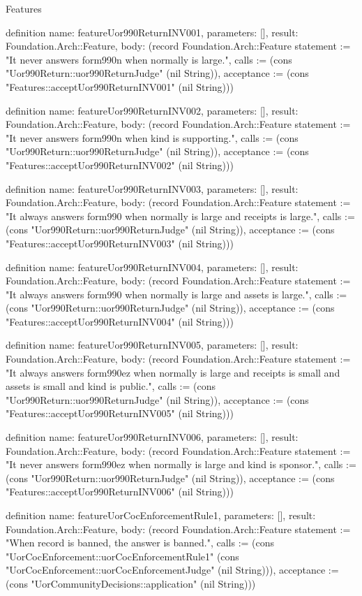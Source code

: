 \begin{lexlean}{Features}
\begin{semanticmodule}
definition{
  name: featureUor990ReturnINV001,
  parameters: [],
  result: Foundation.Arch::Feature,
  body: (record Foundation.Arch::Feature {statement := "It never answers form990n when normally is large.", calls := (cons "Uor990Return::uor990ReturnJudge" (nil String)), acceptance := (cons "Features::acceptUor990ReturnINV001" (nil String))})
}

definition{
  name: featureUor990ReturnINV002,
  parameters: [],
  result: Foundation.Arch::Feature,
  body: (record Foundation.Arch::Feature {statement := "It never answers form990n when kind is supporting.", calls := (cons "Uor990Return::uor990ReturnJudge" (nil String)), acceptance := (cons "Features::acceptUor990ReturnINV002" (nil String))})
}

definition{
  name: featureUor990ReturnINV003,
  parameters: [],
  result: Foundation.Arch::Feature,
  body: (record Foundation.Arch::Feature {statement := "It always answers form990 when normally is large and receipts is large.", calls := (cons "Uor990Return::uor990ReturnJudge" (nil String)), acceptance := (cons "Features::acceptUor990ReturnINV003" (nil String))})
}

definition{
  name: featureUor990ReturnINV004,
  parameters: [],
  result: Foundation.Arch::Feature,
  body: (record Foundation.Arch::Feature {statement := "It always answers form990 when normally is large and assets is large.", calls := (cons "Uor990Return::uor990ReturnJudge" (nil String)), acceptance := (cons "Features::acceptUor990ReturnINV004" (nil String))})
}

definition{
  name: featureUor990ReturnINV005,
  parameters: [],
  result: Foundation.Arch::Feature,
  body: (record Foundation.Arch::Feature {statement := "It always answers form990ez when normally is large and receipts is small and assets is small and kind is public.", calls := (cons "Uor990Return::uor990ReturnJudge" (nil String)), acceptance := (cons "Features::acceptUor990ReturnINV005" (nil String))})
}

definition{
  name: featureUor990ReturnINV006,
  parameters: [],
  result: Foundation.Arch::Feature,
  body: (record Foundation.Arch::Feature {statement := "It never answers form990ez when normally is large and kind is sponsor.", calls := (cons "Uor990Return::uor990ReturnJudge" (nil String)), acceptance := (cons "Features::acceptUor990ReturnINV006" (nil String))})
}

definition{
  name: featureUorCocEnforcementRule1,
  parameters: [],
  result: Foundation.Arch::Feature,
  body: (record Foundation.Arch::Feature {statement := "When record is banned, the answer is banned.", calls := (cons "UorCocEnforcement::uorCocEnforcementRule1" (cons "UorCocEnforcement::uorCocEnforcementJudge" (nil String))), acceptance := (cons "UorCommunityDecisions::application" (nil String))})
}


\end{semanticmodule}
\end{lexlean}
